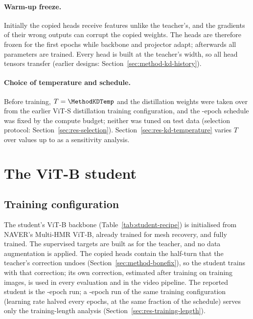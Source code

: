 \paragraph{Warm-up freeze.} Initially the copied heads receive features unlike the teacher's, and the gradients of their
wrong outputs can corrupt the copied weights. The heads are therefore frozen for the first
\MethodStudentFreeze{} epochs while backbone and projector adapt; afterwards all parameters are trained. Every head is built at the teacher's width, so all head tensors transfer (earlier designs:
Section~\ref{sec:method-kd-history}).

\paragraph{Choice of temperature and schedule.} Before training, $T=\MethodKDTemp$ and the distillation weights were
taken over from the earlier ViT-S distillation training configuration, and the \MethodStudentEpochs-epoch schedule was fixed by the
compute budget; neither was tuned on test data (selection protocol: Section~\ref{sec:res-selection}).
Section~\ref{sec:res-kd-temperature} varies $T$ over \KDSweepArms{} values up to \KDSweepMaxT{} as a sensitivity
analysis.

\section{The ViT-B student}
\label{sec:method-student}

\subsection{Training configuration}
\label{sec:method-student-config}

The student's ViT-B backbone (Table~\ref{tab:student-recipe}) is initialised from NAVER's Multi-HMR ViT-B, already
trained for mesh recovery, and fully trained. The supervised targets are built as for the teacher, and no data
augmentation is applied. The copied heads contain the half-turn
that the teacher's correction undoes (Section~\ref{sec:method-bonefix}), so the student trains with that correction;
its own correction, estimated after training on \MethodBoneFixImages{} training images, is used in every evaluation and
in the video pipeline. The reported student is the \MethodStudentEpochs-epoch run; a \StudentSixtyEpochs-epoch run of
the same training configuration (learning rate halved every \LossLRHalfSixty{} epochs, at the same fraction of the
schedule) serves only the training-length analysis (Section~\ref{sec:res-training-length}).

